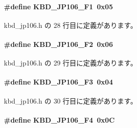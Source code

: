 \paragraph[{K\+B\+D\+\_\+\+J\+P106\+\_\+\+F1}]{\setlength{\rightskip}{0pt plus 5cm}\#define K\+B\+D\+\_\+\+J\+P106\+\_\+\+F1~0x05}\label{kbd__jp106_8h_a1f87d5a6cfd04922b55d70199b8bda2f_a1f87d5a6cfd04922b55d70199b8bda2f}


 kbd\+\_\+jp106.\+h の 28 行目に定義があります。

\paragraph[{K\+B\+D\+\_\+\+J\+P106\+\_\+\+F2}]{\setlength{\rightskip}{0pt plus 5cm}\#define K\+B\+D\+\_\+\+J\+P106\+\_\+\+F2~0x06}\label{kbd__jp106_8h_a7b175f4587574fa07bcaf916d422acb5_a7b175f4587574fa07bcaf916d422acb5}


 kbd\+\_\+jp106.\+h の 29 行目に定義があります。

\paragraph[{K\+B\+D\+\_\+\+J\+P106\+\_\+\+F3}]{\setlength{\rightskip}{0pt plus 5cm}\#define K\+B\+D\+\_\+\+J\+P106\+\_\+\+F3~0x04}\label{kbd__jp106_8h_aed323fcbb885ecbc8305f5455aa55098_aed323fcbb885ecbc8305f5455aa55098}


 kbd\+\_\+jp106.\+h の 30 行目に定義があります。

\paragraph[{K\+B\+D\+\_\+\+J\+P106\+\_\+\+F4}]{\setlength{\rightskip}{0pt plus 5cm}\#define K\+B\+D\+\_\+\+J\+P106\+\_\+\+F4~0x0\+C}\label{kbd__jp106_8h_af07f3d6ae4becd24f1234e61aa98a6d3_af07f3d6ae4becd24f1234e61aa98a6d3}


